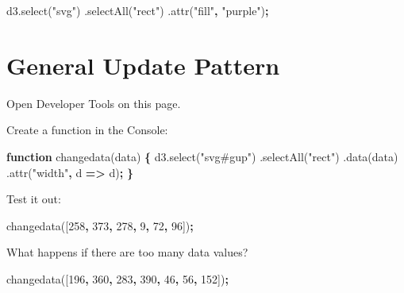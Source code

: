 \documentclass[openany]{book}
\newenvironment{Shaded}{\begin{snugshade}}{\end{snugshade}}
\newcommand{\AttributeTok}[1]{\textcolor[rgb]{0.77,0.63,0.00}{#1}}
\newcommand{\DecValTok}[1]{\textcolor[rgb]{0.00,0.00,0.81}{#1}}
\newcommand{\KeywordTok}[1]{\textcolor[rgb]{0.13,0.29,0.53}{\textbf{#1}}}
\newcommand{\NormalTok}[1]{#1}
\newcommand{\OperatorTok}[1]{\textcolor[rgb]{0.81,0.36,0.00}{\textbf{#1}}}
\newcommand{\StringTok}[1]{\textcolor[rgb]{0.31,0.60,0.02}{#1}}
\newcommand{\VariableTok}[1]{\textcolor[rgb]{0.00,0.00,0.00}{#1}}
\begin{document}
\begin{Shaded}
\begin{Highlighting}[]
\VariableTok{d3}\NormalTok{.}\AttributeTok{select}\NormalTok{(}\StringTok{"svg"}\NormalTok{)}
\NormalTok{  .}\AttributeTok{selectAll}\NormalTok{(}\StringTok{"rect"}\NormalTok{)}
\NormalTok{  .}\AttributeTok{attr}\NormalTok{(}\StringTok{"fill"}\OperatorTok{,} \StringTok{"purple"}\NormalTok{)}\OperatorTok{;}
\end{Highlighting}
\end{Shaded}

\hypertarget{general-update-pattern}{%
\section{General Update Pattern}\label{general-update-pattern}}

Open Developer Tools on this page.

Create a function in the Console:

\begin{Shaded}
\begin{Highlighting}[]
\KeywordTok{function} \AttributeTok{changedata}\NormalTok{(data) }\OperatorTok{\{}
  \VariableTok{d3}\NormalTok{.}\AttributeTok{select}\NormalTok{(}\StringTok{"svg#gup"}\NormalTok{)}
\NormalTok{    .}\AttributeTok{selectAll}\NormalTok{(}\StringTok{"rect"}\NormalTok{)}
\NormalTok{    .}\AttributeTok{data}\NormalTok{(data)}
\NormalTok{    .}\AttributeTok{attr}\NormalTok{(}\StringTok{"width"}\OperatorTok{,}\NormalTok{ d }\OperatorTok{=>}\NormalTok{ d)}\OperatorTok{;}
    \OperatorTok{\}}
\end{Highlighting}
\end{Shaded}

Test it out:

\begin{Shaded}
\begin{Highlighting}[]
\AttributeTok{changedata}\NormalTok{([}\DecValTok{258}\OperatorTok{,} \DecValTok{373}\OperatorTok{,} \DecValTok{278}\OperatorTok{,} \DecValTok{9}\OperatorTok{,} \DecValTok{72}\OperatorTok{,} \DecValTok{96}\NormalTok{])}\OperatorTok{;}
\end{Highlighting}
\end{Shaded}

What happens if there are too many data values?

\begin{Shaded}
\begin{Highlighting}[]
\AttributeTok{changedata}\NormalTok{([}\DecValTok{196}\OperatorTok{,} \DecValTok{360}\OperatorTok{,} \DecValTok{283}\OperatorTok{,} \DecValTok{390}\OperatorTok{,} \DecValTok{46}\OperatorTok{,} \DecValTok{56}\OperatorTok{,} \DecValTok{152}\NormalTok{])}\OperatorTok{;}
\end{Highlighting}
\end{Shaded}
\end{document}
